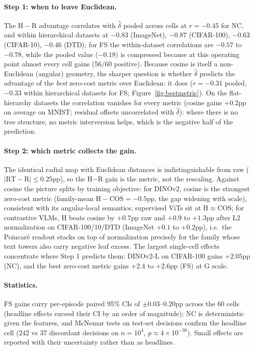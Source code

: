 \documentclass{article} %
\begin{document}
\paragraph{Step 1: when to leave Euclidean.} The $\mathrm{H{-}R}$ advantage correlates with $\hat\delta$ pooled across cells at $r=-0.45$ for NC, and within hierarchical datasets at $-0.83$ (ImageNet), $-0.87$ (CIFAR-100), $-0.63$ (CIFAR-10), $-0.46$ (DTD); for FS the within-dataset correlations are $-0.57$ to $-0.78$, while the pooled value ($-0.18$) is compressed because at this operating point almost every cell gains (56/60 positive). %
Because cosine is itself a non-Euclidean (angular) geometry, the sharper question is whether $\hat\delta$ predicts the advantage of the \emph{best} zero-cost metric over Euclidean: it does ($r=-0.31$ pooled, $-0.33$ within hierarchical datasets for FS; Figure~\ref{fig:bestmetric}). On the flat-hierarchy datasets the correlation vanishes for every metric (cosine gains $+0.2$pp on average on MNIST; residual offsets uncorrelated with $\hat\delta$): where there is no tree structure, no metric interversion helps, which is the negative half of the prediction. %

\paragraph{Step 2: which metric collects the gain.} The identical radial map with Euclidean distances is indistinguishable from raw ($|\mathrm{RT{-}R}| \le 0.25$pp), so the H$-$R gain is the metric, not the rescaling. Against cosine the picture splits by training objective: for DINOv2, cosine is the strongest zero-cost metric (family-mean $\mathrm{H{-}COS} = -0.5$pp, the gap widening with scale), consistent with its angular-local semantics; supervised ViTs sit at $\mathrm{H} \approx \mathrm{COS}$; for contrastive VLMs, H beats cosine by $+0.7$pp raw and $+0.9$ to $+1.3$pp after L2 normalization on CIFAR-100/10/DTD (ImageNet $+0.1$ to $+0.2$pp), i.e.\ the Poincar\'{e} readout stacks on top of normalization precisely for the family whose text towers also carry negative leaf excess. %
The largest single-cell effects concentrate where Step 1 predicts them: DINOv2-L on CIFAR-100 gains $+2.05$pp (NC), and the best zero-cost metric gains $+2.4$ to $+2.6$pp (FS) at G scale. %

\paragraph{Statistics.} FS gains carry per-episode paired 95\% CIs of $\pm 0.03$--$0.20$pp across the 60 cells (headline effects exceed their CI by an order of magnitude); NC is deterministic given the features, and McNemar tests on test-set decisions confirm the headline cell (242 vs 37 discordant decisions on $n{=}10^4$, $p \approx 4\times 10^{-38}$). Small effects are reported with their uncertainty rather than as headlines. %
\end{document}
